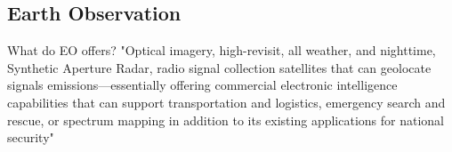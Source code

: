 



\bigskip
\subsection{Earth Observation}
\bigskip

What do EO offers? "Optical imagery, high-revisit, all weather, and nighttime, Synthetic Aperture Radar, radio signal collection satellites that can geolocate signals emissions—essentially offering commercial electronic intelligence capabilities that can support transportation and logistics, emergency search and rescue, or spectrum mapping in addition to its existing applications for national security"
\cite{Hallex}



